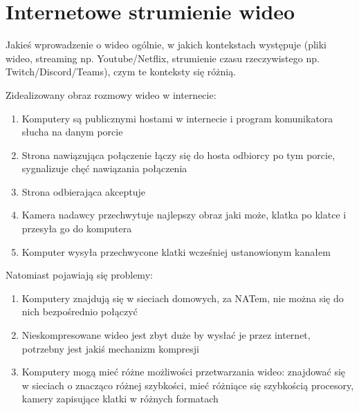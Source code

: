 \chapter{Internetowe strumienie wideo}

Jakieś wprowadzenie o wideo ogólnie, w jakich kontekstach występuje (pliki wideo, streaming np. Youtube/Netflix,
strumienie czasu rzeczywistego np. Twitch/Discord/Teams), czym te konteksty się różnią.

Zidealizowany obraz rozmowy wideo w internecie:
\begin{enumerate}
	\item Komputery są publicznymi hostami w internecie i program komunikatora słucha na danym porcie
	\item Strona nawiązująca połączenie łączy się do hosta odbiorcy po tym porcie, sygnalizuje chęć nawiązania
	      połączenia
	\item Strona odbierająca akceptuje
	\item Kamera nadawcy przechwytuje najlepszy obraz jaki może, klatka po klatce i przesyła go do komputera
	\item Komputer wysyła przechwycone klatki wcześniej ustanowionym kanałem
\end{enumerate}

Natomiast pojawiają się problemy:

\begin{enumerate}
	\item Komputery znajdują się w sieciach domowych, za NATem, nie można się do nich bezpośrednio połączyć
	\item Nieskompresowane wideo jest zbyt duże by wysłać je przez internet, potrzebny jest jakiś mechanizm kompresji
	\item Komputery mogą mieć różne możliwości przetwarzania wideo: znajdować się w sieciach o znacząco różnej
	      szybkości, mieć różniące się szybkością procesory, kamery zapisujące klatki w różnych formatach
\end{enumerate}
